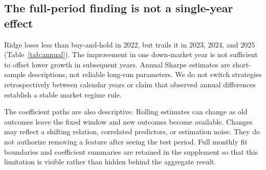 \subsection{The full-period finding is not a single-year effect}
\begin{table}[t]
 \centering\small
 \caption{Calendar-year compounded net returns. The portfolio path is continuous across year boundaries.}
 \label{tab:annual}
 \resizebox{\columnwidth}{!}{}
\end{table}
Ridge loses less than buy-and-hold in 2022, but trails it in 2023, 2024, and 2025 (Table~\ref{tab:annual}). The improvement in one down-market year is not sufficient to offset lower growth in subsequent years. Annual Sharpe estimates are short-sample descriptions, not reliable long-run parameters. We do not switch strategies retrospectively between calendar years or claim that observed annual differences establish a stable market regime rule.

The coefficient paths are also descriptive. Rolling estimates can change as old outcomes leave the fixed window and new outcomes become available. Changes may reflect a shifting relation, correlated predictors, or estimation noise. They do not authorize removing a feature after seeing the test period. Full monthly fit boundaries and coefficient summaries are retained in the supplement so that this limitation is visible rather than hidden behind the aggregate result.

